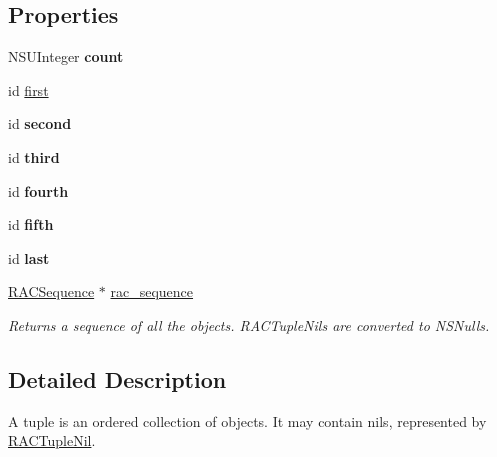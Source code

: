 \subsection*{Properties}
\begin{DoxyCompactItemize}
\item 
\mbox{\label{interface_r_a_c_tuple_a05aac44155eb0b27aeb126229eac5250}} 
N\+S\+U\+Integer {\bfseries count}
\item 
id \mbox{\hyperlink{interface_r_a_c_tuple_a663c06d1f88cde0fc952bc2540c12c54}{first}}
\item 
\mbox{\label{interface_r_a_c_tuple_acfcf027928bbf9155f113544c93d1e60}} 
id {\bfseries second}
\item 
\mbox{\label{interface_r_a_c_tuple_a853607b17a6565f0a6120f7c22cfec1c}} 
id {\bfseries third}
\item 
\mbox{\label{interface_r_a_c_tuple_ae4891aa339188b8bf4ea0832d9863313}} 
id {\bfseries fourth}
\item 
\mbox{\label{interface_r_a_c_tuple_ad91cd8138e3473e565a357d9920c62ee}} 
id {\bfseries fifth}
\item 
\mbox{\label{interface_r_a_c_tuple_a35b7e9307ae91c30f7d1c07eda2ca482}} 
id {\bfseries last}
\item 
\mbox{\label{interface_r_a_c_tuple_a6ddee991ca6d808b0393e273a1f2576d}} 
\mbox{\hyperlink{interface_r_a_c_sequence}{R\+A\+C\+Sequence}} $\ast$ \mbox{\hyperlink{interface_r_a_c_tuple_a6ddee991ca6d808b0393e273a1f2576d}{rac\+\_\+sequence}}
\begin{DoxyCompactList}\small\item\em Returns a sequence of all the objects. R\+A\+C\+Tuple\+Nils are converted to N\+S\+Nulls. \end{DoxyCompactList}\end{DoxyCompactItemize}


\subsection{Detailed Description}
A tuple is an ordered collection of objects. It may contain nils, represented by \mbox{\hyperlink{interface_r_a_c_tuple_nil}{R\+A\+C\+Tuple\+Nil}}. 

